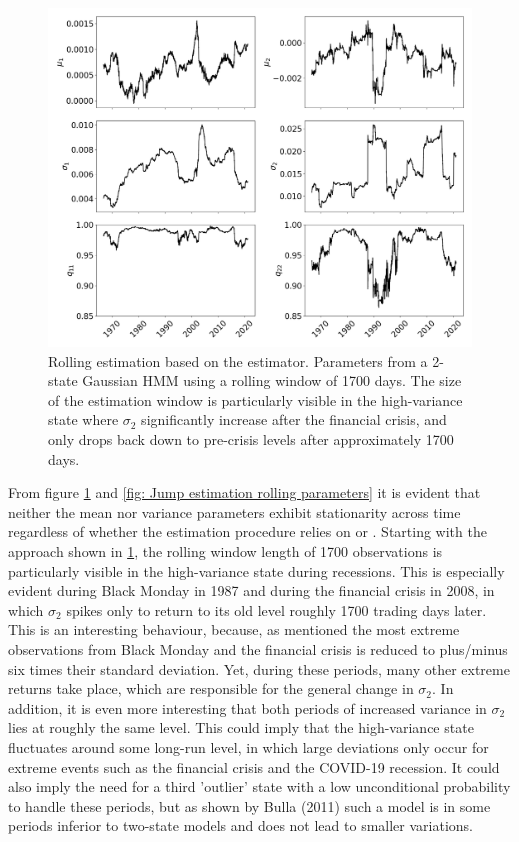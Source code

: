 \begin{figure}[H] 
    \centering
    \includegraphics[width=1.0\textwidth]{analysis/stylized_facts/images/2-state MLE HMM rolling params.png}
    \caption[Rolling estimation based on the \mle estimator]{Rolling estimation based on the \mle estimator. Parameters from a 2-state Gaussian HMM using a rolling window of 1700 days. The size of the estimation window is particularly visible in the high-variance state where $\sigma_2$ significantly increase after the financial crisis, and only drops back down to pre-crisis levels after approximately 1700 days.}
    \label{fig: MLE estimation rolling parameters} 
\end{figure}

From figure \ref{fig: MLE estimation rolling parameters} and \ref{fig: Jump estimation rolling parameters} it is evident that neither the mean nor variance parameters exhibit stationarity across time regardless of whether the estimation procedure relies on \mle or \jump. Starting with the \mle approach shown in \cref{fig: MLE estimation rolling parameters}, the rolling window length of 1700 observations is particularly visible in the high-variance state during recessions. This is especially evident during Black Monday in 1987 and during the financial crisis in 2008, in which $\sigma_2$ spikes only to return to its old level roughly 1700 trading days later. This is an interesting behaviour, because, as mentioned the most extreme observations from Black Monday and the financial crisis is reduced to plus/minus six times their standard deviation. Yet, during these periods, many other extreme returns take place, which are responsible for the general change in $\sigma_2$. In addition, it is even more interesting that both periods of increased variance in $\sigma_2$ lies at roughly the same level. This could imply that the high-variance state fluctuates around some long-run level, in which large deviations only occur for extreme events such as the financial crisis and the COVID-19 recession. It could also imply the need for a third 'outlier' state with a low unconditional probability to handle these periods, but as shown by Bulla (2011) such a model is in some periods inferior to two-state models and does not lead to smaller variations.

